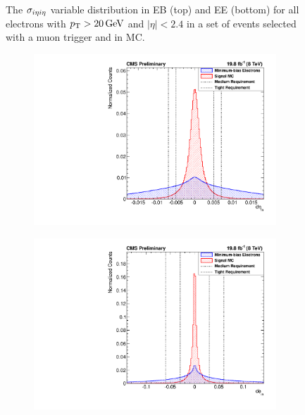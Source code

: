 \begin{figure}[!htbp]
\begin{subfigure}[b]{\StackedPlotWidth}
        \caption{}
        \label{fig:sieie_ee}
    \end{subfigure}
    \caption[
        Distributions of $\sigmaietaieta$ in EB and EE in data and MC.
    ]{
        The $\sigmaietaieta$ variable distribution in EB (top) and EE (bottom)
        for all electrons with $p_{\mathrm{T}} > 20 \,\text{Ge\hspace{-.08em}V}$ and $|\eta| < 2.4$ in a set of
        events selected with a muon trigger and in \MADGRAPH \Ztoee MC.
    }
    \label{fig:sieie}
\end{figure}

\begin{figure}[!htbp]
    \centering
    \begin{subfigure}[b]{\StackedPlotWidth}
        \includegraphics[width=\textwidth]{figures/e_reco_var_deta.pdf}
        \caption{}
        \label{fig:deta}
    \end{subfigure}
    \begin{subfigure}[b]{\StackedPlotWidth}
        \includegraphics[width=\textwidth]{figures/e_reco_var_dphi.pdf}

\end{subfigure}
\end{figure}
